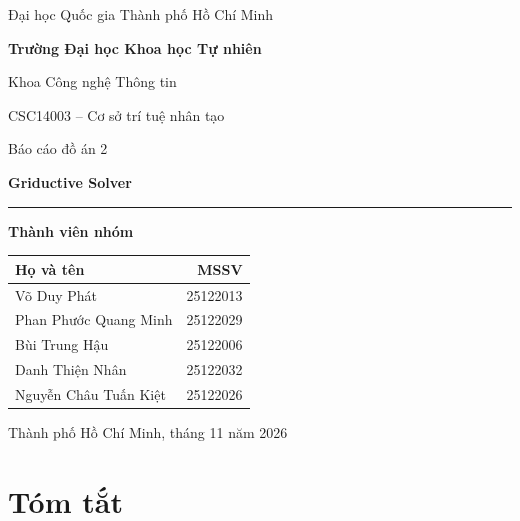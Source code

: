 \documentclass[11pt,a4paper]{article}
\newcommand{\studentengine}{Võ Duy Phát}
\newcommand{\studentagent}{Phan Phước Quang Minh}
\newcommand{\studentcnf}{Bùi Trung Hậu}
\newcommand{\studentdpll}{Danh Thiện Nhân}
\newcommand{\studentgui}{Nguyễn Châu Tuấn Kiệt}
\newcommand{\course}{CSC14003 -- Cơ sở trí tuệ nhân tạo}
\begin{document}
\hypersetup{pageanchor=false}

\begin{titlepage}
\centering

{\large Đại học Quốc gia Thành phố Hồ Chí Minh\par}
{\large\bfseries Trường Đại học Khoa học Tự nhiên\par}
{\large Khoa Công nghệ Thông tin\par}

\vfill

{\large \course\par}

\vspace{9mm}

{\Large Báo cáo đồ án 2\par}

\vspace{4mm}

{\Huge\bfseries\color{navy} Griductive Solver\par}

\vspace{6mm}

{\color{navy}\rule{65mm}{0.7pt}\par}

\vspace{12mm}

{\large\bfseries Thành viên nhóm\par}

\vspace{3mm}

\begin{tabular}{@{}lr@{}}
\toprule
\textbf{Họ và tên} & \textbf{MSSV}\\
\midrule
\studentengine & 25122013\\
\studentagent & 25122029\\
\studentcnf & 25122006\\
\studentdpll & 25122032\\
\studentgui & 25122026\\
\bottomrule
\end{tabular}

\vfill

Thành phố Hồ Chí Minh, tháng 11 năm 2026

\end{titlepage}

\hypersetup{pageanchor=true}

\section*{Tóm tắt}
\end{document}
